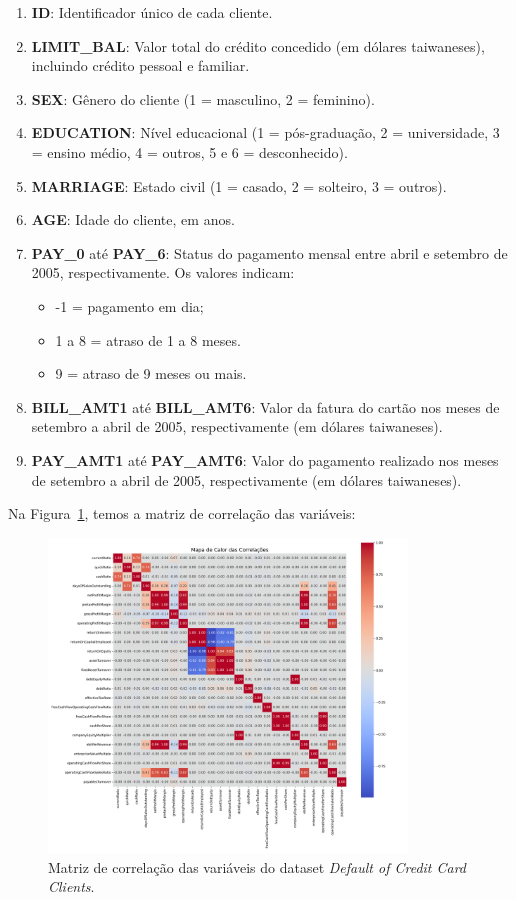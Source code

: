 \begin{enumerate}
    \item \textbf{ID}: Identificador único de cada cliente.
    \item \textbf{LIMIT\_BAL}: Valor total do crédito concedido (em dólares taiwaneses), incluindo crédito pessoal e familiar.
    \item \textbf{SEX}: Gênero do cliente (1 = masculino, 2 = feminino).
    \item \textbf{EDUCATION}: Nível educacional (1 = pós-graduação, 2 = universidade, 3 = ensino médio, 4 = outros, 5 e 6 = desconhecido).
    \item \textbf{MARRIAGE}: Estado civil (1 = casado, 2 = solteiro, 3 = outros).
    \item \textbf{AGE}: Idade do cliente, em anos.
    \item \textbf{PAY\_0} até \textbf{PAY\_6}: Status do pagamento mensal entre abril e setembro de 2005, respectivamente. Os valores indicam:
    \begin{itemize}
        \item -1 = pagamento em dia;
        \item 1 a 8 = atraso de 1 a 8 meses.
        \item 9 = atraso de 9 meses ou mais.
    \end{itemize}
    \item \textbf{BILL\_AMT1} até \textbf{BILL\_AMT6}: Valor da fatura do cartão nos meses de setembro a abril de 2005, respectivamente (em dólares taiwaneses).
    \item \textbf{PAY\_AMT1} até \textbf{PAY\_AMT6}: Valor do pagamento realizado nos meses de setembro a abril de 2005, respectivamente (em dólares taiwaneses).
\end{enumerate}
Na Figura~\ref{fig:matriz_correlacao_inadimplencia}, temos a matriz de correlação das variáveis:

\begin{figure}[H]
    \centering
    \includegraphics[width=0.85\textwidth]{figs/matriz_correlacao_inadimplencia.png}
    \caption{Matriz de correlação das variáveis do dataset \textit{Default of Credit Card Clients}.}
    \label{fig:matriz_correlacao_inadimplencia}
\end{figure}

